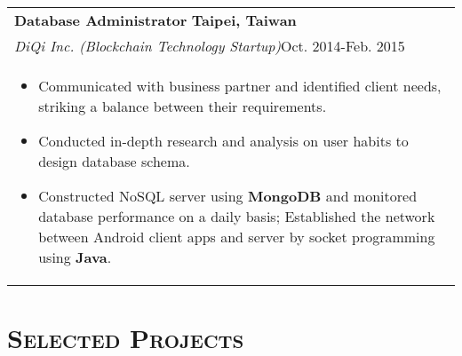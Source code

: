 \documentclass[a4paper,11pt]{article} %
\begin{document}
{\begin{tabular}{p{18.5cm}}
%
{\bf{Database Administrator}} \hfill \bf{Taipei, Taiwan}\\ 
{\it DiQi Inc. (Blockchain Technology Startup)}\hfill  Oct. 2014-Feb. 2015  \\%
\begin{itemize}
\vspace{-3mm}
\item Communicated with business partner and identified client needs, striking a balance between their requirements. 
\item Conducted in-depth research and analysis on user habits to design database schema.
\item Constructed NoSQL server using {\bf MongoDB} and monitored database performance on a daily basis; Established the network between Android client apps and server by socket programming using {\bf Java}. \vspace*{-\baselineskip}
\end{itemize}\\
\end{tabular}


\section{\Large\bf\textsc{Selected Projects}}
\begin{tabular}{p{18.5cm}}


\end{tabular}}
\end{document}
